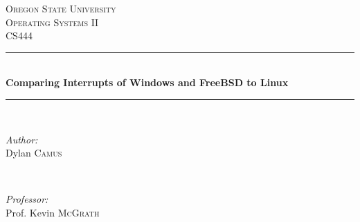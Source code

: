 \documentclass[journal,letterpaper,draftclsnofoot,onecolumn,10pt]{IEEEtran}
\begin{document}
\begin{titlepage}

\newcommand{\HRule}{\rule{\linewidth}{0.5mm}} %

\center %
 

\textsc{\LARGE Oregon State University}\\[1.5cm] %
\textsc{\Large Operating Systems II}\\[0.5cm] %
\textsc{\large CS444}\\[0.5cm] %


\HRule \\[0.4cm]
{ \huge \bfseries Comparing Interrupts of Windows and FreeBSD to Linux}\\[0.4cm] %
\HRule \\[1.5cm]
 

\begin{minipage}{0.4\textwidth}
   \begin{flushleft} \large
      \emph{Author:}\\
      Dylan \textsc{Camus} %
   \end{flushleft}
\end{minipage}
~
\begin{minipage}{0.4\textwidth}
   \begin{flushright} \large
      \emph{Professor:} \\
      Prof. Kevin \textsc{McGrath} %
   \end{flushright}
\end{minipage}\\[4cm]



\end{titlepage}
\end{document}
